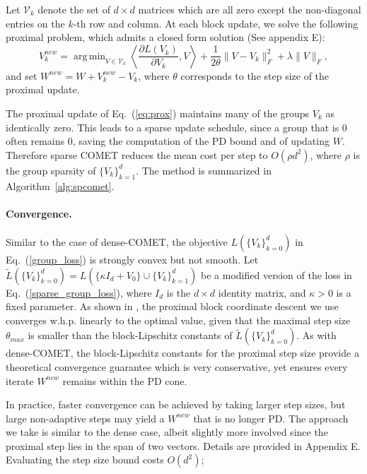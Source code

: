 \documentclass[twoside,11pt]{article}
\newcommand\mat[1]{{#1}}
\newcommand{\W}{\mat{W}}
\newcommand{\Vk}{\mat{V_k}}
\newcommand{\Vg}{\{\Vk\}_{k=0}^{d}} %
\newcommand{\Vgrc}{\{\Vk\}_{k=1}^{d}} %
\renewcommand{\eqref}[1]{Eq.~(\ref{#1})}
\DeclareMathOperator*{\argmin}{arg\,min}
\begin{document}
Let $\mathcal{V}_k$ denote the set of $d \times d$ matrices which are all zero except the non-diagonal entries on the $k$-th row and column. At each block update, we solve the following proximal problem, which admits a closed form solution \citep{bach2012optimization} (See appendix E):
\begin{equation}\label{eq:prox}
V_k^{new} = \argmin_{\mat{V} \in \mathcal{V}_k} \left\langle \frac{\partial{L (V_k)}}{\partial V_k}, \mat{V} \right\rangle + \frac{1}{2\theta}\|V - V_k\|_F^2 + \lambda \|V\|_F,
\end{equation}
and set $\W^{new} = \W + V_k^{new} - V_k$, where $\theta$ corresponds to the step size of the proximal update.

The proximal update of \eqref{eq:prox} maintains many of the groups $V_k$ as identically zero. This leads to a sparse update schedule, since a group that is $0$ often remains $0$, saving the computation of the PD bound and of updating $\W$. Therefore sparse COMET reduces the mean cost per step to $O(\rho d^2)$, where $\rho$ is the group sparsity of $\Vgrc$. The method is summarized in Algorithm~\ref{alg:spcomet}.

\paragraph{Convergence.}
Similar to the case of dense-COMET, the objective $L(\Vg)$ in \eqref{group_loss} is strongly convex but not smooth. Let $\tilde{L}(\Vg) = L(\{\kappa I_d + V_0\} \cup \{V_k\}_{k=1}^d)$ be a modified version of the loss in \eqref{sparse_group_loss}, where $I_d$ is the $d \times d$ identity matrix, and $\kappa>0$ is a fixed parameter.
As shown in \cite[Theorem 7]{richtarik2014iteration}, the proximal block coordinate descent we use converges w.h.p. linearly to the optimal value, given that the maximal step size $\theta_{max}$ is smaller than the block-Lipschitz constants of $\tilde{L}(\Vg)$. 
As with dense-COMET, the block-Lipschitz constants for the proximal step size provide a theoretical convergence guarantee which is very conservative, yet ensures every iterate $\W^{new}$ remains within the PD cone.

In practice, faster convergence can be achieved by taking larger step sizes, but large non-adaptive steps may yield a  $\W^{new}$ that is no longer PD. The approach we take is similar to the dense case, albeit slightly more involved since the proximal step lies in the span of two vectors. Details are provided in Appendix E. Evaluating the step size bound costs $O(d^2)$;  
\end{document}
